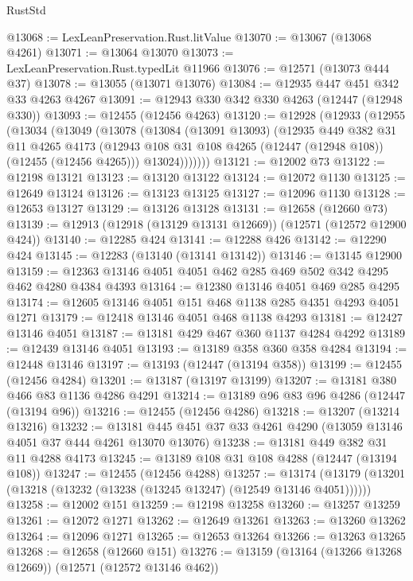 \begin{lexlean}{RustStd}
\begin{coremodule}
@13068 := LexLeanPreservation.Rust.litValue
@13070 := @13067 (@13068 @4261)
@13071 := @13064 @13070
@13073 := LexLeanPreservation.Rust.typedLit @11966
@13076 := @12571 (@13073 @444 @37)
@13078 := @13055 (@13071 @13076)
@13084 := @12935 @447 @451 @342 @33 @4263 @4267
@13091 := @12943 @330 @342 @330 @4263 (@12447 (@12948 @330))
@13093 := @12455 (@12456 @4263)
@13120 := @12928
    (@12933
      (@12955
        (@13034
          (@13049
            (@13078
              (@13084
                (@13091 @13093)
                (@12935
                  @449
                  @382
                  @31
                  @11
                  @4265
                  @4173
                  (@12943 @108 @31 @108 @4265 (@12447 (@12948 @108)) (@12455 (@12456 @4265)))
                  @13024)))))))
@13121 := @12002 @73
@13122 := @12198 @13121
@13123 := @13120 @13122
@13124 := @12072 @1130
@13125 := @12649 @13124
@13126 := @13123 @13125
@13127 := @12096 @1130
@13128 := @12653 @13127
@13129 := @13126 @13128
@13131 := @12658 (@12660 @73)
@13139 := @12913 (@12918 (@13129 @13131 @12669)) (@12571 (@12572 @12900 @424))
@13140 := @12285 @424
@13141 := @12288 @426
@13142 := @12290 @424
@13145 := @12283 (@13140 (@13141 @13142))
@13146 := @13145 @12900
@13159 := @12363 @13146 @4051 @4051 @462 @285 @469 @502 @342 @4295 @462 @4280 @4384 @4393
@13164 := @12380 @13146 @4051 @469 @285 @4295
@13174 := @12605 @13146 @4051 @151 @468 @1138 @285 @4351 @4293 @4051 @1271
@13179 := @12418 @13146 @4051 @468 @1138 @4293
@13181 := @12427 @13146 @4051
@13187 := @13181 @429 @467 @360 @1137 @4284 @4292
@13189 := @12439 @13146 @4051
@13193 := @13189 @358 @360 @358 @4284
@13194 := @12448 @13146
@13197 := @13193 (@12447 (@13194 @358))
@13199 := @12455 (@12456 @4284)
@13201 := @13187 (@13197 @13199)
@13207 := @13181 @380 @466 @83 @1136 @4286 @4291
@13214 := @13189 @96 @83 @96 @4286 (@12447 (@13194 @96))
@13216 := @12455 (@12456 @4286)
@13218 := @13207 (@13214 @13216)
@13232 := @13181 @445 @451 @37 @33 @4261 @4290 (@13059 @13146 @4051 @37 @444 @4261 @13070 @13076)
@13238 := @13181 @449 @382 @31 @11 @4288 @4173
@13245 := @13189 @108 @31 @108 @4288 (@12447 (@13194 @108))
@13247 := @12455 (@12456 @4288)
@13257 := @13174 (@13179 (@13201 (@13218 (@13232 (@13238 (@13245 @13247) (@12549 @13146 @4051))))))
@13258 := @12002 @151
@13259 := @12198 @13258
@13260 := @13257 @13259
@13261 := @12072 @1271
@13262 := @12649 @13261
@13263 := @13260 @13262
@13264 := @12096 @1271
@13265 := @12653 @13264
@13266 := @13263 @13265
@13268 := @12658 (@12660 @151)
@13276 := @13159 (@13164 (@13266 @13268 @12669)) (@12571 (@12572 @13146 @462))

\end{coremodule}
\end{lexlean}
